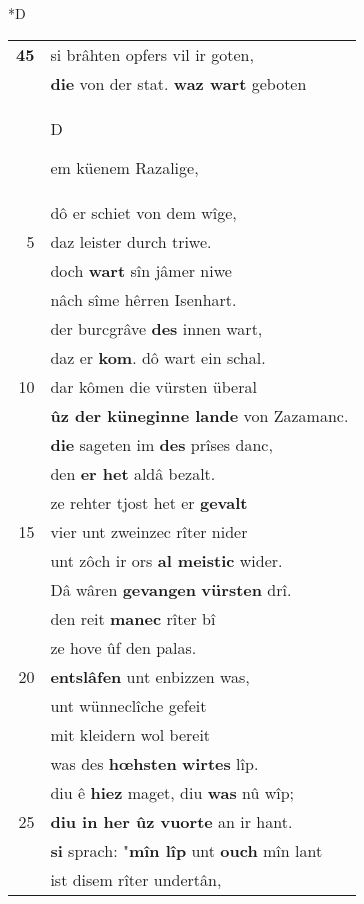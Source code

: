 \documentclass[8pt,a4paper,notitlepage]{article}
\begin{document}
\begin{table}[ht]
\begin{minipage}[t]{0.5\linewidth}
\small
\begin{center}*D
\end{center}
\begin{tabular}{rl}
\textbf{45} & si brâhten opfers vil ir goten,\\ 
 & \textbf{die} von der stat. \textbf{waz wart} geboten\\ 
 & \begin{large}D\end{large}em küenem Razalige,\\ 
 & dô er schiet von dem wîge,\\ 
5 & daz leister durch triwe.\\ 
 & doch \textbf{wart} sîn jâmer niwe\\ 
 & nâch sîme hêrren Isenhart.\\ 
 & der burcgrâve \textbf{des} innen wart,\\ 
 & daz er \textbf{kom}. dô wart ein schal.\\ 
10 & dar kômen die vürsten überal\\ 
 & \textbf{ûz der küneginne lande} von Zazamanc.\\ 
 & \textbf{die} sageten im \textbf{des} prîses danc,\\ 
 & den \textbf{er het} aldâ bezalt.\\ 
 & ze rehter tjost het er \textbf{gevalt}\\ 
15 & vier unt zweinzec rîter nider\\ 
 & unt zôch ir ors \textbf{al meistic} wider.\\ 
 & Dâ wâren \textbf{gevangen} \textbf{vürsten} drî.\\ 
 & den reit \textbf{manec} rîter bî\\ 
 & ze hove ûf den palas.\\ 
20 & \textbf{entslâfen} unt enbizzen was,\\ 
 & unt wünneclîche gefeit\\ 
 & mit kleidern wol bereit\\ 
 & was des \textbf{hœhsten} \textbf{wirtes} lîp.\\ 
 & diu ê \textbf{hiez} maget, diu \textbf{was} nû wîp;\\ 
25 & \textbf{diu in her ûz vuorte} an ir hant.\\ 
 & \textbf{si} sprach: "\textbf{mîn lîp} unt \textbf{ouch} mîn lant\\ 
 & ist disem rîter undertân,\\ 

\end{tabular}
\end{minipage}
\end{table}
\end{document}

